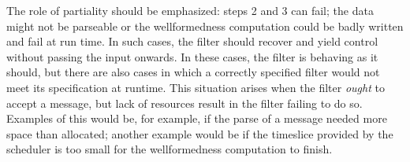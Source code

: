 \begin{remark}[Partiality]

The role of partiality should be emphasized: steps 2 and 3 can fail;
the data might not be parseable or the wellformedness computation
could be badly written and fail at run time. In such cases, the filter
should recover and yield control without passing the input onwards. In
these cases, the filter is behaving as it should, but there are also
cases in which a correctly specified filter would not meet its
specification at runtime. This situation arises when the
filter \emph{ought} to accept a message, but lack of resources result
in the filter failing to do so. Examples of this would be, for
example, if the parse of a message needed more space than allocated;
another example would be if the timeslice provided by the scheduler is
too small for the wellformedness computation to finish.

\end{remark}


